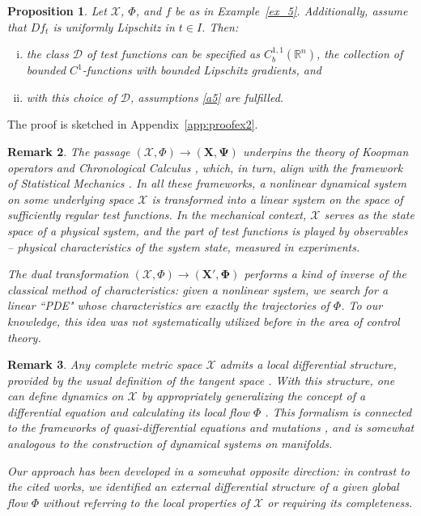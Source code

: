 \documentclass[sn-mathphys-num]{sn-jnl}
\numberwithin{equation}{section}
\theoremstyle{mythm}
\newtheorem{proposition}{Proposition}[section]
\theoremstyle{mydef}
\newtheorem{remark}[proposition]{Remark}
\newcommand{\R}{\mathbb{R}}
\begin{document}
\begin{proposition}\label{propo:ex2}
    Let $\mathcal{X}$, $\Phi$, and $f$ be as in Example~\ref{ex_5}. Additionally, assume that \( Df_t \) is uniformly Lipschitz in \( t \in I \). Then: 
    \begin{enumerate}[i)]
        \item the class \( \bm{\mathcal D} \) of test functions can be specified as \( C^{1,1}_b(\R^n) \), the collection of bounded \( C^1 \)-functions with bounded Lipschitz gradients, and 
        \item with this choice of \( \bm{\mathcal D} \), assumptions \ref{a5} are fulfilled.
    \end{enumerate}
\end{proposition}
The proof is sketched in  Appendix~\ref{app:proofex2}. 
\begin{remark}
The passage $(\mathcal{X}, \Phi) \to (\bm{X}, \bm \Psi)$ underpins the theory of Koopman operators \cite{koopman1931hamiltonian, mauroy2020koopman} and Chronological Calculus \cite{agrachevControlTheoryGeometric2004, kipkaExtensionChronologicalCalculus2015}, which, in turn, align with the framework of Statistical Mechanics \cite{nestruev2003smooth}. In all these frameworks, a nonlinear dynamical system on some underlying space $\mathcal{X}$ is transformed into a linear system on the space of sufficiently regular test functions. In the mechanical context, $\mathcal X$ serves as the state space of a physical system, and the part of test functions is played by observables -- physical characteristics of the system state, measured in experiments.

The dual transformation $(\mathcal{X}, \Phi) \to (\bm{X}', \bm \Phi)$ performs a kind of inverse of the classical method of characteristics: given a nonlinear system, we search for a linear ``PDE" whose characteristics are exactly the trajectories of $\Phi$. To our knowledge, this idea was not systematically utilized before in the area of control theory.
\end{remark} 

\begin{remark}
    Any complete metric space \( \mathcal{X} \) admits a local differential structure, provided by the usual definition of the tangent space \cite{burago2001course,Kirchheim1994,Lytchak2005}. With this structure, one can define dynamics on \( \mathcal{X} \) by appropriately generalizing the concept of a differential equation and calculating its local flow $\Phi$ \cite{ColomboR009, LakshmikanthamDiffeqmetr,tabordiff}. This formalism is connected to the frameworks of quasi-differential equations \cite{Plotnikov1998, Panasyuk1985} and mutations \cite{aubin1993mutational}, and is somewhat analogous to the construction of dynamical systems on manifolds. 

Our approach has been developed in a somewhat opposite direction: in contrast to the cited works, we identified an external differential structure of a given global flow $\Phi$ without referring to the local properties of \(\mathcal{X}\) or requiring its completeness.

\end{remark}
\end{document}
